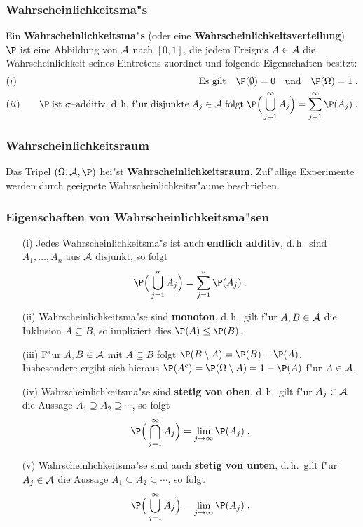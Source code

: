 \subsubsection{Wahrscheinlichkeitsma"s}
Ein \textbf{Wahrscheinlichkeitsma"s} (oder eine \textbf{Wahrscheinlichkeitsverteilung})
 $\P$ ist eine Abbildung von $\mathcal
A$ nach $[0,1]$, die jedem Ereignis $A\in \mathcal A$ die Wahrscheinlichkeit seines
Eintretens zuordnet und folgende Eigenschaften besitzt$\colon$
\begin{eqnarray*}
&(i)&\quad\mbox{Es gilt}\quad \P(\emptyset)=0\quad\mbox{und}\quad \P(\Omega)=1\;.\\
&(ii)&\quad
\P\;\mbox{ist $\sigma$--additiv, d.\,h.~f"ur disjunkte}\;A_j\in\fr A\;\mbox{folgt}\;
\P\Big(\bigcup_{j=1}^\infty A_j\Big)=\sum_{j=1}^\infty\P(A_j)\;.
\end{eqnarray*}
\subsubsection{Wahrscheinlichkeitsraum}
Das Tripel $(\Omega,\fr A,\P)$ hei"st \textbf{Wahrscheinlichkeitsraum}. Zuf"allige
Experimente werden durch geeignete Wahrscheinlichkeitsr"aume  beschrieben.
\subsubsection{Eigenschaften von Wahrscheinlichkeitsma"sen}
\begin{enumerate}
\item[\rm(i)]
Jedes Wahrscheinlichkeitsma"s ist auch \textbf{endlich additiv}, d.\,h.~sind
$A_1,\ldots,A_n$ aus $\mathcal A$ disjunkt, so folgt
$$
\P\Big(\bigcup_{j=1}^n A_j\Big)=\sum_{j=1}^n\P(A_j)\;.
$$
\item[\rm(ii)]
Wahrscheinlichkeitsma"se sind \textbf{monoton}, d.\,h.~gilt f"ur $A,B\in\mathcal A$ die Inklusion
$A\subseteq B$, so impliziert dies $\P(A)\le\P(B)$.
\item[\rm(iii)]
F"ur $A,B\in\mathcal A$ mit $A\subseteq B$ folgt $\P(B\setminus A)=\P(B)-\P(A)$. Insbesondere ergibt sich hieraus
$\P(A^c)=\P(\Omega\setminus A)=1-\P(A)$ f"ur $A\in\mathcal A$.
\item[\rm(iv)]
Wahrscheinlichkeitsma"se sind \textbf{stetig von oben}, d.\,h.~gilt f"ur $A_j\in\mathcal A$
die Aussage $A_1\supseteq A_2\supseteq\cdots$,
so folgt
$$
\P\Big(\bigcap_{j=1}^\infty A_j\Big)=\lim_{j\to\infty}\P(A_j)\;.
$$
\item[\rm(v)]
Wahrscheinlichkeitsma"se sind auch \textbf{stetig von unten}, d.\,h.~gilt f"ur $A_j\in\mathcal A$
die Aussage $A_1\subseteq A_2\subseteq\cdots$,
so folgt
$$
\P\Big(\bigcup_{j=1}^\infty A_j\Big)=\lim_{j\to\infty}\P(A_j)\;.
$$
\end{enumerate}
